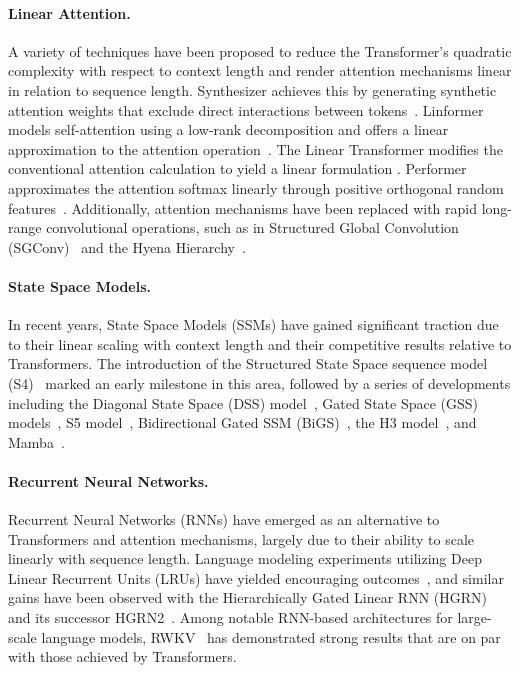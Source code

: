 \paragraph{Linear Attention.} A variety of techniques have been proposed to reduce the Transformer's quadratic complexity with respect to context length and render attention mechanisms linear in relation to sequence length. Synthesizer achieves this by generating synthetic attention weights that exclude direct interactions between tokens~\citep{Tay:20arxiv}. Linformer models self-attention using a low-rank decomposition and offers a linear approximation to the attention operation~\citep{Wang:20arxiv}. The Linear Transformer modifies the conventional attention calculation to yield a linear formulation \citep{Katharopoulos:20}. Performer approximates the attention softmax linearly through positive orthogonal random features~\citep{Choromanski:21}. Additionally, attention mechanisms have been replaced with rapid long-range convolutional operations, such as in Structured Global Convolution (SGConv)~\citep{Li:22} and the Hyena Hierarchy~\citep{Poli:23}.

\paragraph{State Space Models.} In recent years, State Space Models (SSMs) have gained significant traction due to their linear scaling with context length and their competitive results relative to Transformers. The introduction of the Structured State Space sequence model (S4)~\citep{Gu:21} marked an early milestone in this area, followed by a series of developments including the Diagonal State Space (DSS) model~\citep{Gupta:22}, Gated State Space (GSS) models~\citep{Mehta:22}, S5 model~\citep{Smith:22}, Bidirectional Gated SSM (BiGS)~\citep{Wang:22}, the H3 model~\citep{Fu:23}, and Mamba~\citep{Gu:24arxiv}.

\paragraph{Recurrent Neural Networks.} Recurrent Neural Networks (RNNs) have emerged as an alternative to Transformers and attention mechanisms, largely due to their ability to scale linearly with sequence length. Language modeling experiments utilizing Deep Linear Recurrent Units (LRUs) have yielded encouraging outcomes~\citep{Orvieto:23, De:24arxiv}, and similar gains have been observed with the Hierarchically Gated Linear RNN (HGRN)~\citep{Qin:23} and its successor HGRN2~\citep{Qin:24arxiv}. Among notable RNN-based architectures for large-scale language models, RWKV~\citep{Peng:23arxivshort,Peng:24arxivshort} has demonstrated strong results that are on par with those achieved by Transformers.

